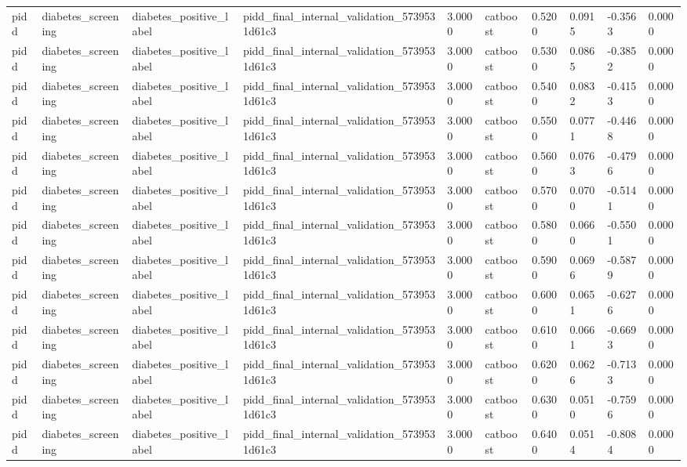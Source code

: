 \begin{tabular}{llllllllll}
pidd & diabetes\_screening & diabetes\_positive\_label & pidd\_final\_internal\_validation\_5739531d61c3 & 3.0000 & catboost & 0.5200 & 0.0915 & -0.3563 & 0.0000 \\
pidd & diabetes\_screening & diabetes\_positive\_label & pidd\_final\_internal\_validation\_5739531d61c3 & 3.0000 & catboost & 0.5300 & 0.0865 & -0.3852 & 0.0000 \\
pidd & diabetes\_screening & diabetes\_positive\_label & pidd\_final\_internal\_validation\_5739531d61c3 & 3.0000 & catboost & 0.5400 & 0.0832 & -0.4153 & 0.0000 \\
pidd & diabetes\_screening & diabetes\_positive\_label & pidd\_final\_internal\_validation\_5739531d61c3 & 3.0000 & catboost & 0.5500 & 0.0771 & -0.4468 & 0.0000 \\
pidd & diabetes\_screening & diabetes\_positive\_label & pidd\_final\_internal\_validation\_5739531d61c3 & 3.0000 & catboost & 0.5600 & 0.0763 & -0.4796 & 0.0000 \\
pidd & diabetes\_screening & diabetes\_positive\_label & pidd\_final\_internal\_validation\_5739531d61c3 & 3.0000 & catboost & 0.5700 & 0.0700 & -0.5141 & 0.0000 \\
pidd & diabetes\_screening & diabetes\_positive\_label & pidd\_final\_internal\_validation\_5739531d61c3 & 3.0000 & catboost & 0.5800 & 0.0660 & -0.5501 & 0.0000 \\
pidd & diabetes\_screening & diabetes\_positive\_label & pidd\_final\_internal\_validation\_5739531d61c3 & 3.0000 & catboost & 0.5900 & 0.0696 & -0.5879 & 0.0000 \\
pidd & diabetes\_screening & diabetes\_positive\_label & pidd\_final\_internal\_validation\_5739531d61c3 & 3.0000 & catboost & 0.6000 & 0.0651 & -0.6276 & 0.0000 \\
pidd & diabetes\_screening & diabetes\_positive\_label & pidd\_final\_internal\_validation\_5739531d61c3 & 3.0000 & catboost & 0.6100 & 0.0661 & -0.6693 & 0.0000 \\
pidd & diabetes\_screening & diabetes\_positive\_label & pidd\_final\_internal\_validation\_5739531d61c3 & 3.0000 & catboost & 0.6200 & 0.0626 & -0.7133 & 0.0000 \\
pidd & diabetes\_screening & diabetes\_positive\_label & pidd\_final\_internal\_validation\_5739531d61c3 & 3.0000 & catboost & 0.6300 & 0.0510 & -0.7596 & 0.0000 \\
pidd & diabetes\_screening & diabetes\_positive\_label & pidd\_final\_internal\_validation\_5739531d61c3 & 3.0000 & catboost & 0.6400 & 0.0514 & -0.8084 & 0.0000 \\

\end{tabular}
